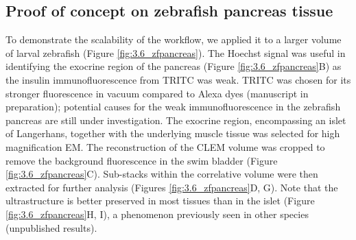 \subsection{Proof of concept on zebrafish pancreas tissue}
\label{sec:3R_zfpancreas}
To demonstrate the scalability of the workflow, we applied it to a larger volume of larval zebrafish (Figure \ref{fig:3.6_zfpancreas}). The Hoechst signal was useful in identifying the exocrine region of the pancreas (Figure \ref{fig:3.6_zfpancreas}B) as the insulin immunofluorescence from TRITC was weak. TRITC was chosen for its stronger fluorescence in vacuum compared to Alexa dyes (manuscript in preparation); potential causes for the weak immunofluorescence in the zebrafish pancreas are still under investigation. The exocrine region, encompassing an islet of Langerhans, together with the underlying muscle tissue was selected for high magnification EM. The reconstruction of the CLEM volume was cropped to remove the background fluorescence in the swim bladder (Figure \ref{fig:3.6_zfpancreas}C). Sub-stacks within the correlative volume were then extracted for further analysis (Figures \ref{fig:3.6_zfpancreas}D, G). Note that the ultrastructure is better preserved in most tissues than in the islet (Figure \ref{fig:3.6_zfpancreas}H, I), a phenomenon previously seen in other species (unpublished results).

